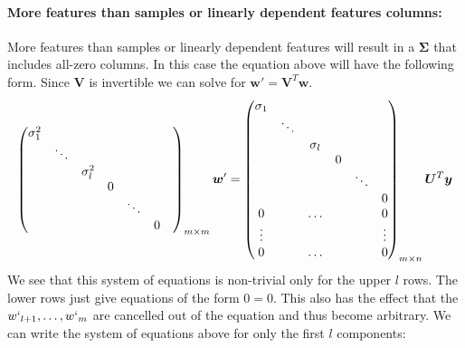 \paragraph{More features than samples or linearly dependent features columns:}
More features than samples or linearly dependent features will result in a $\bm{\Sigma}$ that includes all-zero columns.
In this case the equation above will have the following form.
Since $\bm{V}$ is invertible we can solve for $\bm{w}' = \bm{V}^T \bm{w}$.
\begin{align}
    \begin{pmatrix}
        \sigma_{1}^2 &        &               &   & &      &   \\
                     & \ddots &               &   & &      &   \\
                     &        &  \sigma_{l}^2 &   & &      &   \\
                     &        &               & 0 & &      &   \\
                     &        &               &   & \ddots &   \\                     
                     &        &               &   &        & 0 \\                     
    \end{pmatrix}_{m \times m} \bm{w}' = 
    \begin{pmatrix}
        \sigma_{1}   &        &               &   &        &   \\
                     & \ddots &               &   &        &   \\
                     &        &  \sigma_{l}   &   &        &   \\
                     &        &               & 0 &        &   \\
                     &        &               &   & \ddots &   \\  
                     &        &               &   &        & 0 \\
        0            &        &  \hdots       &   &        & 0      \\
        \vdots       &        &               &   &        & \vdots \\
        0            &        &  \hdots       &   &        & 0      \\                     
    \end{pmatrix}_{m \times n}\bm{U}^T \bm{y} \\
\end{align}
We see that this system of equations is non-trivial only for the upper $l$ rows.
The lower rows just give equations of the form $0=0$. This also has the effect that 
the $w`_{l+1}, \hdots, w`_{m}$ are cancelled out of the equation and thus become arbitrary.
We can write the system of equations above for only the first $l$ components:

